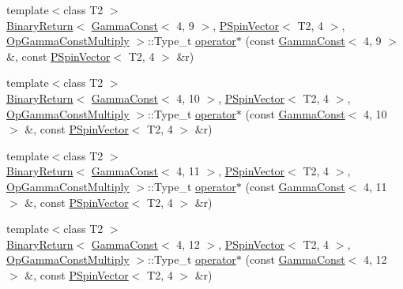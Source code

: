 \begin{DoxyCompactItemize}
\item 
{\footnotesize template$<$class T2 $>$ }\\\mbox{\hyperlink{structENSEM_1_1BinaryReturn}{Binary\+Return}}$<$ \mbox{\hyperlink{classENSEM_1_1GammaConst}{Gamma\+Const}}$<$ 4, 9 $>$, \mbox{\hyperlink{classENSEM_1_1PSpinVector}{P\+Spin\+Vector}}$<$ T2, 4 $>$, \mbox{\hyperlink{structENSEM_1_1OpGammaConstMultiply}{Op\+Gamma\+Const\+Multiply}} $>$\+::Type\+\_\+t \mbox{\hyperlink{group__primspinvector_ga61476a03c8d043d2e32e6ba22ec70bb5}{operator$\ast$}} (const \mbox{\hyperlink{classENSEM_1_1GammaConst}{Gamma\+Const}}$<$ 4, 9 $>$ \&, const \mbox{\hyperlink{classENSEM_1_1PSpinVector}{P\+Spin\+Vector}}$<$ T2, 4 $>$ \&r)
\item 
{\footnotesize template$<$class T2 $>$ }\\\mbox{\hyperlink{structENSEM_1_1BinaryReturn}{Binary\+Return}}$<$ \mbox{\hyperlink{classENSEM_1_1GammaConst}{Gamma\+Const}}$<$ 4, 10 $>$, \mbox{\hyperlink{classENSEM_1_1PSpinVector}{P\+Spin\+Vector}}$<$ T2, 4 $>$, \mbox{\hyperlink{structENSEM_1_1OpGammaConstMultiply}{Op\+Gamma\+Const\+Multiply}} $>$\+::Type\+\_\+t \mbox{\hyperlink{group__primspinvector_gab079c599559400400256e044d153a9f0}{operator$\ast$}} (const \mbox{\hyperlink{classENSEM_1_1GammaConst}{Gamma\+Const}}$<$ 4, 10 $>$ \&, const \mbox{\hyperlink{classENSEM_1_1PSpinVector}{P\+Spin\+Vector}}$<$ T2, 4 $>$ \&r)
\item 
{\footnotesize template$<$class T2 $>$ }\\\mbox{\hyperlink{structENSEM_1_1BinaryReturn}{Binary\+Return}}$<$ \mbox{\hyperlink{classENSEM_1_1GammaConst}{Gamma\+Const}}$<$ 4, 11 $>$, \mbox{\hyperlink{classENSEM_1_1PSpinVector}{P\+Spin\+Vector}}$<$ T2, 4 $>$, \mbox{\hyperlink{structENSEM_1_1OpGammaConstMultiply}{Op\+Gamma\+Const\+Multiply}} $>$\+::Type\+\_\+t \mbox{\hyperlink{group__primspinvector_ga4bbdc1bc935fc4378105903d7b0fb65d}{operator$\ast$}} (const \mbox{\hyperlink{classENSEM_1_1GammaConst}{Gamma\+Const}}$<$ 4, 11 $>$ \&, const \mbox{\hyperlink{classENSEM_1_1PSpinVector}{P\+Spin\+Vector}}$<$ T2, 4 $>$ \&r)
\item 
{\footnotesize template$<$class T2 $>$ }\\\mbox{\hyperlink{structENSEM_1_1BinaryReturn}{Binary\+Return}}$<$ \mbox{\hyperlink{classENSEM_1_1GammaConst}{Gamma\+Const}}$<$ 4, 12 $>$, \mbox{\hyperlink{classENSEM_1_1PSpinVector}{P\+Spin\+Vector}}$<$ T2, 4 $>$, \mbox{\hyperlink{structENSEM_1_1OpGammaConstMultiply}{Op\+Gamma\+Const\+Multiply}} $>$\+::Type\+\_\+t \mbox{\hyperlink{group__primspinvector_gacda74bfacd9c872e7d821f2355890a01}{operator$\ast$}} (const \mbox{\hyperlink{classENSEM_1_1GammaConst}{Gamma\+Const}}$<$ 4, 12 $>$ \&, const \mbox{\hyperlink{classENSEM_1_1PSpinVector}{P\+Spin\+Vector}}$<$ T2, 4 $>$ \&r)

\end{DoxyCompactItemize}
